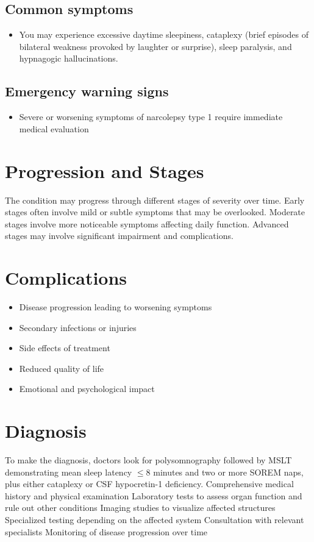 \subsection{Common symptoms}
\begin{itemize}[noitemsep]
  \item You may experience excessive daytime sleepiness, cataplexy (brief episodes of bilateral weakness provoked by laughter or surprise), sleep paralysis, and hypnagogic hallucinations. 
  \end{itemize}

\subsection{Emergency warning signs}
\begin{itemize}[noitemsep]
  \item Severe or worsening symptoms of narcolepsy type 1 require immediate medical evaluation
\end{itemize}
\section{Progression and Stages}
The condition may progress through different stages of severity over time. Early stages often involve mild or subtle symptoms that may be overlooked. Moderate stages involve more noticeable symptoms affecting daily function. Advanced stages may involve significant impairment and complications.
\section{Complications}
\begin{itemize}[noitemsep]
  \item Disease progression leading to worsening symptoms
  \item Secondary infections or injuries
  \item Side effects of treatment
  \item Reduced quality of life
  \item Emotional and psychological impact
\end{itemize}
\section{Diagnosis}
To make the diagnosis, doctors look for polysomnography followed by MSLT demonstrating mean sleep latency $\le$8 minutes and two or more SOREM naps, plus either cataplexy or CSF hypocretin-1 deficiency. Comprehensive medical history and physical examination Laboratory tests to assess organ function and rule out other conditions Imaging studies to visualize affected structures Specialized testing depending on the affected system Consultation with relevant specialists Monitoring of disease progression over time

